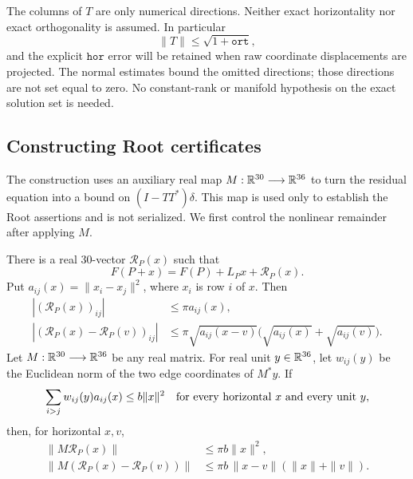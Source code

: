 \begin{remark}
\label{phase:approximate-tangent}
The columns of \(T\) are only numerical directions.  Neither exact
horizontality nor exact orthogonality is assumed.  In particular
\[
 \|T\|\leq\sqrt{1+\mathtt{ort}},
\]
and the explicit \(\mathtt{hor}\) error will be retained when raw
coordinate displacements are projected.  The normal estimates bound
the omitted directions; those directions are not set equal to zero.
No constant-rank or manifold hypothesis on the exact solution set is
needed.
\end{remark}

\subsection{Constructing Root certificates}

The construction uses an auxiliary real map
\(M:\mathbb R^{30}\longrightarrow\mathbb R^{36}\) to turn the residual equation into
a bound on \((I-TT^*)\delta\).  This map is used only to establish the
Root assertions and is not serialized.  We first control the nonlinear
remainder after applying \(M\).

\begin{lemma}
\label{phase:remainder}
There is a real \(30\)-vector \(\mathcal R_P(x)\) such that
\[
 F(P+x)=F(P)+L_Px+\mathcal R_P(x).
\]
Put \(a_{ij}(x)=\|x_i-x_j\|^2\), where \(x_i\) is row \(i\) of \(x\).
Then
\begin{align}
 |(\mathcal R_P(x))_{ij}|&\leq\pi a_{ij}(x), \label{phase:edge-remainder}\\
 |(\mathcal R_P(x)-\mathcal R_P(v))_{ij}|
 &\leq\pi\sqrt{a_{ij}(x-v)}
       \bigl(\sqrt{a_{ij}(x)}+\sqrt{a_{ij}(v)}\bigr).
 \label{phase:edge-difference}
\end{align}
Let \(M:\mathbb R^{30}\longrightarrow\mathbb R^{36}\) be any real matrix.  For real
unit \(y\in\mathbb R^{36}\), let \(w_{ij}(y)\) be the Euclidean norm of the two
edge coordinates of \(M^*y\).  If
\begin{equation}
 \sum_{i>j}w_{ij}(y)a_{ij}(x)\leq b\|x\|^2
 \quad\hbox{for every horizontal \(x\) and every unit \(y\),}
 \label{phase:weighted-constant}
\end{equation}
then, for horizontal \(x,v\),
\begin{align}
 \|M\mathcal R_P(x)\|&\leq\pi b\|x\|^2,
 \label{phase:matrix-remainder}\\
 \|M(\mathcal R_P(x)-\mathcal R_P(v))\|
 &\leq\pi b\,\|x-v\|(\|x\|+\|v\|).
 \label{phase:matrix-difference}
\end{align}
\end{lemma}

